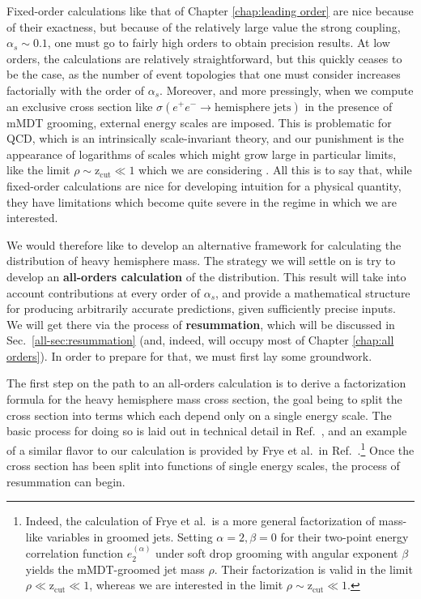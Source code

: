 \documentclass[../thesis.tex]{subfiles}
\providecommand{\zcut}{\mathrm{z_{cut}}}
\begin{document}
	Fixed-order calculations like that of Chapter \ref{chap:leading order} are nice because of their exactness, but because of the relatively large value the strong coupling, $\alpha_s \sim 0.1$, one must go to fairly high orders to obtain precision results. At low orders, the calculations are relatively straightforward, but this quickly ceases to be the case, as the number of event topologies that one must consider increases factorially with the order of $\alpha_s$. Moreover, and more pressingly, when we compute an exclusive cross section like $\sigma(e^+ e^- \to \text{hemisphere jets})$ in the presence of mMDT grooming, external energy scales are imposed. This is problematic for QCD, which is an intrinsically scale-invariant theory, and our punishment is the appearance of logarithms of scales which might grow large in particular limits, like the limit $\rho \sim \zcut \ll 1$ which we are considering \cite{larkoski_elementary_2019-1}. All this is to say that, while fixed-order calculations are nice for developing intuition for a physical quantity, they have limitations which become quite severe in the regime in which we are interested.

	We would therefore like to develop an alternative framework for calculating the distribution of heavy hemisphere mass. The strategy we will settle on is try to develop an \textbf{all-orders calculation} of the distribution. This result will take into account contributions at every order of $\alpha_s$, and provide a mathematical structure for producing arbitrarily accurate predictions, given sufficiently precise inputs. We will get there via the process of \textbf{resummation}, which will be discussed in Sec.~\ref{all-sec:resummation} (and, indeed, will occupy most of Chapter \ref{chap:all orders}). In order to prepare for that, we must first lay some groundwork.

	The first step on the path to an all-orders calculation is to derive a factorization formula for the heavy hemisphere mass cross section, the goal being to split the cross section into terms which each depend only on a single energy scale. The basic process for doing so is laid out in technical detail in Ref.~\cite{becher_introduction_2015-1}, and an example of a similar flavor to our calculation is provided by Frye et al.\ in Ref.~\cite{frye_factorization_2016}.\footnote{Indeed, the calculation of Frye et al.\ is a more general factorization of mass-like variables in groomed jets. Setting $\alpha = 2, \beta = 0$ for their two-point energy correlation function $e_2^{(\alpha)}$ under soft drop grooming with angular exponent $\beta$ yields the mMDT-groomed jet mass $\rho$. Their factorization is valid in the limit $\rho \ll \zcut \ll 1$, whereas we are interested in the limit $\rho \sim \zcut \ll 1$.} Once the cross section has been split into functions of single energy scales, the process of resummation can begin. 
\end{document}
